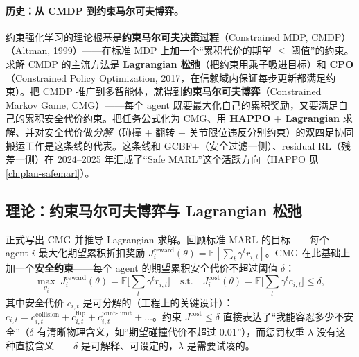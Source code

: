 \paragraph{历史：从 CMDP 到约束马尔可夫博弈。}
约束强化学习的理论根基是\textbf{约束马尔可夫决策过程}（Constrained MDP, CMDP）\cite{altman1999cmdp}（Altman, 1999）——在标准 MDP 上加一个“累积代价的期望 $\le$ 阈值”的约束。求解 CMDP 的主流方法是 \textbf{Lagrangian 松弛}（把约束用乘子吸进目标）和 \textbf{CPO}（Constrained Policy Optimization, 2017\cite{achiam2017constrained}，在信赖域内保证每步更新都满足约束）。把 CMDP 推广到多智能体，就得到\textbf{约束马尔可夫博弈}（Constrained Markov Game, CMG）——每个 agent 既要最大化自己的累积奖励，又要满足自己的累积安全代价约束。把任务公式化为 CMG、用 \textbf{HAPPO $+$ Lagrangian} 求解、并对安全代价做\emph{分解}（碰撞 $+$ 翻转 $+$ 关节限位违反分别约束）的双四足协同搬运工作是这条线的代表。这条线和 GCBF+（安全过滤一侧）、residual RL（残差一侧）在 2024--2025 年汇成了“Safe MARL”这个活跃方向（HAPPO 见 \cref{ch:plan-safemarl}\cite{kuba2022happo}）。

\subsection{理论：约束马尔可夫博弈与 Lagrangian 松弛}
\label{sec:mh-cmg}

正式写出 CMG 并推导 Lagrangian 求解。回顾标准 MARL 的目标——每个 agent $i$ 最大化期望累积折扣奖励 $J_i^{\text{reward}}(\theta)=\mathbb{E}[\sum_t\gamma^tr_{i,t}]$。CMG 在此基础上加一个\textbf{安全约束}——每个 agent 的期望累积安全代价不超过阈值 $\delta$：
\begin{equation}
  \max_{\theta_i}\ J_i^{\text{reward}}(\theta)=\mathbb{E}\Big[\textstyle\sum_t\gamma^tr_{i,t}\Big]\quad\text{s.t.}\quad J_i^{\text{cost}}(\theta)=\mathbb{E}\Big[\textstyle\sum_t\gamma^tc_{i,t}\Big]\le\delta,
  \label{eq:mh-cmg}
\end{equation}
其中安全代价 $c_{i,t}$ 是可分解的（工程上的关键设计）：$c_{i,t}=c_{i,t}^{\text{collision}}+c_{i,t}^{\text{flip}}+c_{i,t}^{\text{joint-limit}}+\dots$。约束 $J^{\text{cost}}\le\delta$ 直接表达了“我能容忍多少不安全”（$\delta$ 有清晰物理含义，如“期望碰撞代价不超过 $0.01$”），而惩罚权重 $\lambda$ 没有这种直接含义——$\delta$ 是可解释、可设定的，$\lambda$ 是需要试凑的。

